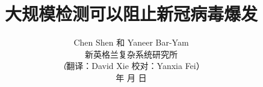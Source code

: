 \documentclass[onecolumn,journal]{IEEEtran}
\begin{document}
\title{\color{Brown} 大规模检测可以阻止新冠病毒爆发 \\
\vspace{-0.35ex}}
\author{Chen Shen 和 Yaneer Bar-Yam \\ 新英格兰复杂系统研究所 \\
\vspace{+0.35ex}
\small{\textit（{翻译：David Xie  校对：Yanxia Fei}）}\\
  年  月  日
  \vspace{-14ex} \\


\bigskip
\bigskip

\textbf{}
 }

\maketitle


\flushbottom %



\thispagestyle{empty} %




\renewcommand{\thefootnote}{\fnsymbol{footnote}}
\end{document}
